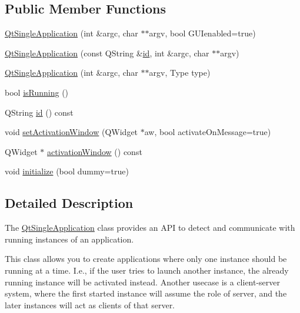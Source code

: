 \subsection*{Public Member Functions}
\begin{DoxyCompactItemize}
\item 
\hyperlink{class_qt_single_application_afe5e96d236e42949e65669eca282acbd}{Qt\+Single\+Application} (int \&argc, char $\ast$$\ast$argv, bool G\+U\+Ienabled=true)
\item 
\hyperlink{class_qt_single_application_a746192779985e28f22fd17766884518e}{Qt\+Single\+Application} (const Q\+String \&\hyperlink{class_qt_single_application_a025290493ba51d3eba54d0041502a380}{id}, int \&argc, char $\ast$$\ast$argv)
\item 
\hyperlink{class_qt_single_application_adcb7a28eec3eef34c6474fb419509895}{Qt\+Single\+Application} (int \&argc, char $\ast$$\ast$argv, Type type)
\item 
bool \hyperlink{class_qt_single_application_aa9f0e6e4f18ac79bbb7a955cd860894d}{is\+Running} ()
\item 
Q\+String \hyperlink{class_qt_single_application_a025290493ba51d3eba54d0041502a380}{id} () const
\item 
void \hyperlink{class_qt_single_application_acb5347f6dc6822dbe4d6a78804043528}{set\+Activation\+Window} (Q\+Widget $\ast$aw, bool activate\+On\+Message=true)
\item 
Q\+Widget $\ast$ \hyperlink{class_qt_single_application_ab3102811d7d4c84f355300873abdff2b}{activation\+Window} () const
\item 
void \hyperlink{class_qt_single_application_a622807c60657c1a1fadec15ea5903b47}{initialize} (bool dummy=true)
\end{DoxyCompactItemize}


\subsection{Detailed Description}
The \hyperlink{class_qt_single_application}{Qt\+Single\+Application} class provides an A\+PI to detect and communicate with running instances of an application. 

This class allows you to create applications where only one instance should be running at a time. I.\+e., if the user tries to launch another instance, the already running instance will be activated instead. Another usecase is a client-\/server system, where the first started instance will assume the role of server, and the later instances will act as clients of that server.

